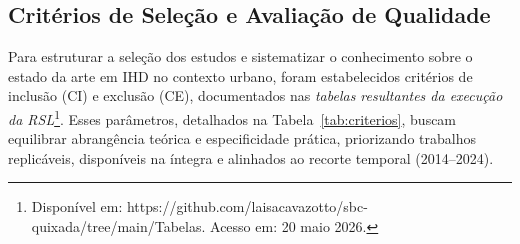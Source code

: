 \documentclass[12pt]{article}
\begin{document}

\subsection{Critérios de Seleção e Avaliação de Qualidade}

  Para estruturar a seleção dos estudos e sistematizar o conhecimento sobre o estado da arte em IHD no contexto urbano, foram estabelecidos critérios de inclusão (CI) e exclusão (CE), documentados nas \emph{tabelas resultantes da execução da RSL}\footnote{Disponível em: https://github.com/laisacavazotto/sbc-quixada/tree/main/Tabelas. Acesso em: 20 maio 2026.}\edef\footTabelas{\thefootnote}. Esses parâmetros, detalhados na Tabela~\ref{tab:criterios}, buscam equilibrar  abrangência teórica e especificidade prática, priorizando trabalhos replicáveis, disponíveis na íntegra e alinhados ao recorte temporal (2014–2024).
\end{document}
